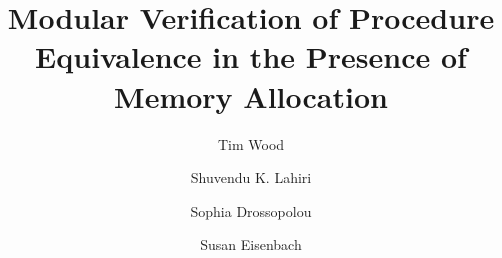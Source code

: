 \documentclass[runningheads,a4paper]{llncs}
\begin{document}
\mainmatter  %

\title{Modular Verification of Procedure Equivalence in the Presence of Memory Allocation}


%
%
\author{Tim Wood \and Shuvendu K. Lahiri \and Sophia Drossopolou \and Susan Eisenbach}
%


%
%

\maketitle

\newcommand*\symdiffequivn{e-equivalence}
\newcommand*\Symdiffequivn{E-equivalence}
\newcommand*\symdiffequiva{e-equivalent}
\newcommand*\Symdiffequiva{E-equivalent}
\newcommand*\cone{challenge~1}
\newcommand*\ctwo{challenge~2}
\newcommand*\cthree{challenge~3}
\newcommand*\cfour{challenge~4}
\newcommand*\Cone{Challenge~1}
\newcommand*\Ctwo{Challenge~2}
\newcommand*\Cthree{Challenge~3}
\newcommand*\Cfour{Challenge~4}
\newcommand*\metho{RIE}
\newcommand*\tool{APE}
\newcommand*\Tool{APE}
\end{document}
